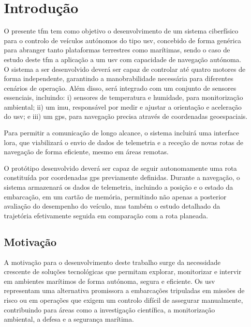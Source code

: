 
\chapter{Introdução}
\label{ch:introducao}

O presente \gls{tfm} tem como objetivo o desenvolvimento de um sistema ciberfísico para o controlo de veículos autónomos do tipo \gls{usv}, concebido de forma genérica para abranger tanto plataformas terrestres como marítimas, sendo o caso de estudo deste \gls{tfm} a aplicação a um \gls{usv} com capacidade de navegação autónoma. O sistema a ser desenvolvido deverá ser capaz de controlar até quatro motores de forma independente, garantindo a manobrabilidade necessária para diferentes cenários de operação. Além disso, será integrado com um conjunto de sensores essenciais, incluindo: i) sensores de temperatura e humidade, para monitorização ambiental; ii) um \gls{imu}, responsável por medir e ajustar a orientação e aceleração do \gls{usv}; e iii) um \gls{gps}, para navegação precisa através de coordenadas geoespaciais.

Para permitir a comunicação de longo alcance, o sistema incluirá uma interface \gls{lora}, que viabilizará o envio de dados de telemetria e a receção de novas rotas de navegação de forma eficiente, mesmo em áreas remotas.

O protótipo desenvolvido deverá ser capaz de seguir autonomamente uma rota constituída por coordenadas \gls{gps} previamente definidas. Durante a navegação, o sistema armazenará os dados de telemetria, incluindo a posição e o estado da embarcação, em um cartão de memória, permitindo não apenas a posterior avaliação do desempenho do veículo, mas também o estudo detalhado da trajetória efetivamente seguida em comparação com a rota planeada.

\section{Motivação}
\label{sec:motivacao}

A motivação para o desenvolvimento deste trabalho surge da necessidade crescente de soluções tecnológicas que permitam explorar, monitorizar e intervir em ambientes marítimos de forma autónoma, segura e eficiente. Os \gls{usv} representam uma alternativa promissora a embarcações tripuladas em missões de risco ou em operações que exigem um controlo difícil de assegurar manualmente, contribuindo para áreas como a investigação científica, a monitorização ambiental, a defesa e a segurança marítima.  


